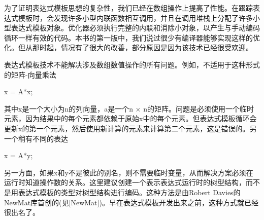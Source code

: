 为了证明表达式模板思想的复杂性，我们已经在数组操作上提高了性能。在跟踪表达式模板时，会发现许多小型内联函数相互调用，并且在调用堆栈上分配了许多小型表达式模板对象。优化器必须执行完整的内联和消除小对象，以产生与手动编码循环一样有效的代码。本书的第一版中，我们说过很少有编译器能够实现这样的优化。但从那时起，情况有了很大的改善，部分原因是因为该技术已经很受欢迎。

表达式模板技术不能解决涉及数组数值操作的所有问题。例如，不适用于这种形式的矩阵-向量乘法

x = A*x;

其中x是一个大小为n的列向量，a是一个n × n的矩阵。问题是必须使用一个临时元素，因为结果中的每个元素都依赖于原始x中的每个元素。但表达式模板循环会更新x的第一个元素，然后使用新计算的元素来计算第二个元素，这是错误的。另一个稍有不同的表达

x = A*y;

另一方面，如果x和y不是彼此的别名，则不需要临时变量，从而解决方案必须在运行时知道操作数的关系。这里建议创建一个表示表达式运行时的树型结构，而不是用表达式模板的类型对树型结构进行编码。这种方法是由Robert Davies的NewMat库首创的(见[NewMat])。早在表达式模板开发出来之前，这种方式就已经很出名了。

















































